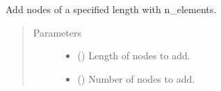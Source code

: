 \documentclass[letterpaper,10pt,english]{sphinxmanual}
\begin{document}
\begin{fulllineitems}
\begin{fulllineitems}
\end{fulllineitems}


\begin{fulllineitems}
\label{\detokenize{mesh:mesh.Mesh1D.add_nodes}}
\sphinxAtStartPar
Add nodes of a specified length with n\_elements.
\begin{quote}\begin{description}
\item[{Parameters}] \leavevmode\begin{itemize}
\item {} 
\sphinxAtStartPar
{} (\sphinxstyleliteralemphasis{\sphinxupquote{{[}}}\sphinxstyleliteralemphasis{\sphinxupquote{{]}}}) \textendash{} Length of nodes to add.

\item {} 
\sphinxAtStartPar
{} (\sphinxstyleliteralemphasis{\sphinxupquote{{[}}}\sphinxstyleliteralemphasis{\sphinxupquote{{]}}}) \textendash{} Number of nodes to add.

\end{itemize}

\end{description}\end{quote}

\end{fulllineitems}


\end{fulllineitems}

\end{document}
